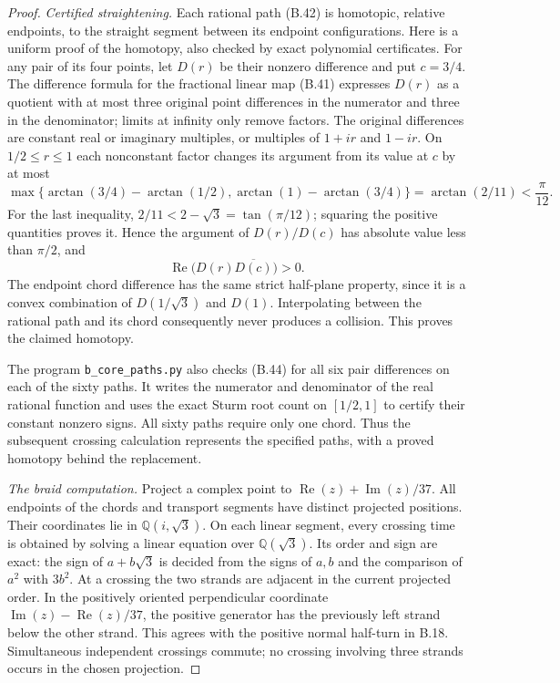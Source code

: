 \begin{proof}
\emph{Certified straightening.}
Each rational path (B.42) is homotopic, relative endpoints,
to the straight segment between its endpoint configurations.
Here is a uniform proof of the homotopy, also checked by
exact polynomial certificates.  For any pair of its four
points, let $D(r)$ be their nonzero difference and put
$c=3/4$.  The difference formula for the fractional linear
map (B.41) expresses $D(r)$ as a quotient with at most three
original point differences in the numerator and three in
the denominator; limits at infinity only remove factors.
The original differences are constant real or imaginary
multiples, or multiples of $1+ir$ and $1-ir$.
On $1/2\leq r\leq1$ each nonconstant factor changes its
argument from its value at $c$ by at most
\[
 \max\{\arctan(3/4)-\arctan(1/2),
           \arctan(1)-\arctan(3/4)\}
   =\arctan(2/11)<\frac{\pi}{12}.
\]
For the last inequality, $2/11<2-\sqrt3=\tan(\pi/12)$;
squaring the positive quantities proves it.  Hence the
argument of $D(r)/D(c)$ has absolute value less than
$\pi/2$, and
\[
 \operatorname{Re}\bigl(D(r)\overline{D(c)}\bigr)>0.
                                                               \tag{B.44}
\]
The endpoint chord difference has the same strict
half-plane property, since it is a convex combination
of $D(1/\sqrt3)$ and $D(1)$.  Interpolating between the
rational path and its chord consequently never produces
a collision.  This proves the claimed homotopy.

The program \texttt{b\_core\_paths.py} also checks (B.44)
for all six pair differences on each of the sixty paths.
It writes the numerator and denominator of the real
rational function and uses the exact Sturm root count on
$[1/2,1]$ to certify their constant nonzero signs.  All
sixty paths require only one chord.  Thus the subsequent
crossing calculation represents the specified paths,
with a proved homotopy behind the replacement.

\emph{The braid computation.}
Project a complex point to
$\operatorname{Re}(z)+\operatorname{Im}(z)/37$.
All endpoints of the chords and transport segments have
distinct projected positions.  Their coordinates lie in
$\mathbb Q(i,\sqrt3)$.  On each linear segment, every
crossing time is obtained by solving a linear equation
over $\mathbb Q(\sqrt3)$.  Its order and sign are exact:
the sign of $a+b\sqrt3$ is decided from the signs of
$a,b$ and the comparison of $a^2$ with $3b^2$.
At a crossing the two strands are adjacent in the current
projected order.  In the positively oriented perpendicular
coordinate $\operatorname{Im}(z)-\operatorname{Re}(z)/37$,
the positive generator has the previously left strand
below the other strand.  This agrees with the positive
normal half-turn in B.18.  Simultaneous independent
crossings commute; no crossing involving three strands
occurs in the chosen projection.


\end{proof}
